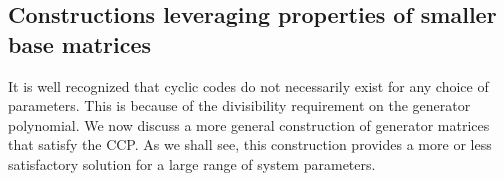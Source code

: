 \documentclass[journal,twocolumn]{IEEEtran}
\theoremstyle{definition}
\newtheorem{claim}{Claim}
\newcommand{\aditya}[1]{\marginpar{+}{\bf Aditya's remark}: {\em #1}}
\begin{document}
\subsection{Constructions leveraging properties of smaller base matrices}
\label{sec:more_cons_block}
It is well recognized that cyclic codes do not necessarily exist for any choice of parameters. This is because of the divisibility requirement on the generator polynomial. We now discuss a more general construction of generator matrices that satisfy the CCP. As we shall see, this construction provides a more or less satisfactory solution for a large range of system parameters.

\end{document}
